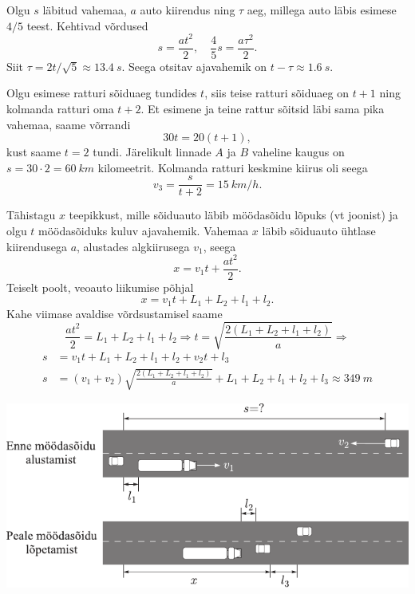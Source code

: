 \documentclass[10pt]{article}
\begin{document}
{%

\solu
Olgu $s$ läbitud vahemaa, $a$ auto kiirendus ning $\tau$ aeg, millega auto läbis esimese $4/5$ teest. Kehtivad võrdused
\[
s=\frac{a t^{2}}{2}, \quad \frac{4}{5} s=\frac{a \tau^{2}}{2}.
\]
Siit $\tau = 2t/\sqrt 5\approx \SI{13,4}{s}$. Seega otsitav ajavahemik on $t-\tau\approx \SI{1,6}{s}$.
\probend
\bigskip


\solu
Olgu esimese ratturi sõiduaeg tundides $t$, siis teise ratturi sõiduaeg on $t + 1$ ning kolmanda ratturi oma $t+2$. Et esimene ja teine rattur sõitsid läbi sama pika vahemaa, saame võrrandi
\[
30 t=20(t+1),
\]
kust saame $t = \num{2}$ tundi. Järelikult linnade $A$ ja $B$ vaheline kaugus on $s = \num{30}·\num{2} = \SI{60}{km}$ kilomeetrit. Kolmanda ratturi keskmine kiirus oli seega
\[
v_{3}=\frac{s}{t+2}=\SI{15}{km/h}.
\]
\probend
\bigskip


\solu
Tähistagu $x$ teepikkust, mille sõiduauto läbib möödasõidu lõpuks (vt joonist) ja olgu $t$ möödasõiduks kuluv ajavahemik. Vahemaa $x$ läbib sõiduauto ühtlase kiirendusega $a$, alustades algkiirusega $v_1$, seega
\[
x = v_1t + \frac{at^2}{2}. 
\]
Teiselt poolt, veoauto liikumise põhjal
\[
x = v_1t + L_1 + L_2 + l_1 + l_2.
\]
Kahe viimase avaldise võrdsustamisel saame
\[
\frac{a t^{2}}{2}=L_{1}+L_{2}+l_{1}+l_{2} \Rightarrow t=\sqrt{\frac{2\left(L_{1}+L_{2}+l_{1}+l_{2}\right)}{a}}\Rightarrow
\]
\[
\begin{aligned}
s &= v_1t + L_1 + L_2 + l_1 + l_2 + v_2t + l_3\\
s &= \left(v_{1}+v_{2}\right) \sqrt{\frac{2\left(L_{1}+L_{2}+l_{1}+l_{2}\right)}{a}}+L_{1}+L_{2}+l_{1}+l_{2}+l_{3} \approx \SI{349}{m}
\end{aligned}
\]

\begin{center}
	\includegraphics[width=\linewidth]{2005-v2g-01-lah}
\end{center}

}
\end{document}
